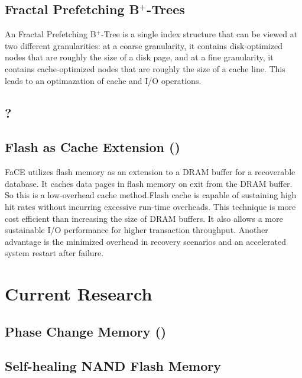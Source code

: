 \documentclass{acm_proc_article-sp}
\begin{document}
\cite{wu2007efficient}

\subsection{Fractal Prefetching B$^{+}$-Trees}
An Fractal Prefetching B$^{+}$-Tree is a single index structure that can be viewed at two different granularities: at a coarse granularity, it contains disk-optimized nodes that are roughly the size of a disk page, and at a fine granularity, it contains cache-optimized nodes that are roughly the size of a cache line. This leads to an optimazation of cache and I/O operations. %

\cite{chen2002fractal}

\subsection{?} %

\subsection{Flash as Cache Extension ()}
FaCE utilizes ﬂash memory as an extension to a DRAM buffer for a recoverable database. It caches data pages in ﬂash memory on exit from the DRAM buffer. So this is a low-overhead cache method.Flash cache is capable of sustaining high hit rates without incurring excessive run-time overheads. This technique is more cost efficient than increasing the size of DRAM buffers. It also allows a more sustainable I/O performance for higher transaction throughput. Another advantage is the minimized overhead in recovery scenarios and an accelerated system restart after failure. %

\cite{kang2012flash}

\section{Current Research}

\subsection{Phase Change Memory ()}

\subsection{Self-healing NAND Flash Memory}
\cite{wu2011exploiting}
\cite{chen2013dheating}
\end{document}
